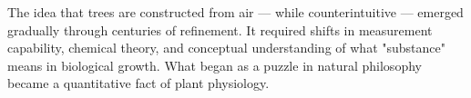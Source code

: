 \begin{historical}
The idea that trees are constructed from air — while counterintuitive — emerged gradually through centuries of refinement. It required shifts in measurement capability, chemical theory, and conceptual understanding of what "substance" means in biological growth. What began as a puzzle in natural philosophy became a quantitative fact of plant physiology.
\end{historical}
